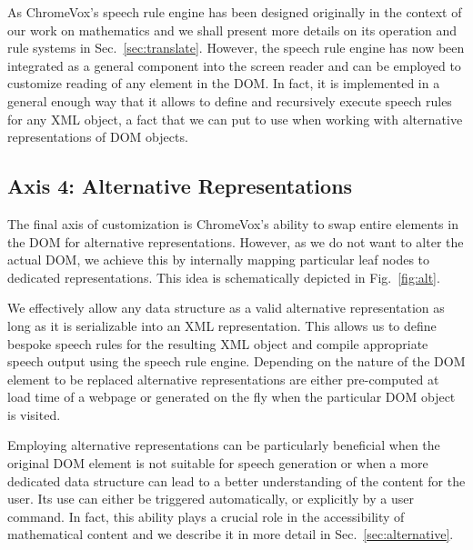 \documentclass{sig-alternate}
\begin{document}
As ChromeVox's speech rule engine has been designed originally in the context of
our work on mathematics and we shall present more details on
its operation and rule systems in Sec.~\ref{sec:translate}. However, the speech
rule engine has now been integrated as a general component into the screen
reader and can be employed to customize reading of any element in the DOM. In
fact, it is implemented in a general enough way that it allows to define and
recursively execute speech rules for any XML object, a fact that we can put to
use when working with alternative representations of DOM objects.


\subsection{Axis 4: Alternative Representations}
\label{sec:ax4}


The final axis of customization is ChromeVox's ability to swap entire elements
in the DOM for alternative representations. However, as we do not want to alter
the actual DOM, we achieve this by internally mapping particular leaf nodes to
dedicated representations. This idea is schematically depicted in
Fig.~\ref{fig:alt}.


We effectively allow any data structure as a valid alternative representation as
long as it is serializable into an XML representation. This allows us to define
bespoke speech rules for the resulting XML object and compile appropriate
speech output using the speech rule engine. Depending on the nature of the DOM
element to be replaced alternative representations are either pre-computed at
load time of a webpage or generated on the fly when the particular DOM object is
visited.

Employing alternative representations can be particularly beneficial when the
original DOM element is not suitable for speech generation or when a more
dedicated data structure can lead to a better understanding of the content
for the user. Its use can either be triggered automatically, or explicitly by a
user command. In fact, this ability plays a crucial role in the accessibility of
mathematical content and we describe it in more detail in
Sec.~\ref{sec:alternative}.
\end{document}
